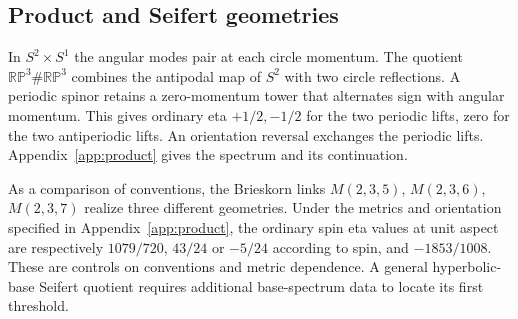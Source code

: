 \subsection{Product and Seifert geometries}
In \(S^2\times S^1\) the angular modes pair at each circle momentum. The quotient \(\mathbb{RP}^3\#\mathbb{RP}^3\) combines the antipodal map of \(S^2\) with two circle reflections. A periodic spinor retains a zero-momentum tower that alternates sign with angular momentum. This gives ordinary eta \(+1/2,-1/2\) for the two periodic lifts, zero for the two antiperiodic lifts. An orientation reversal exchanges the periodic lifts. Appendix~\ref{app:product} gives the spectrum and its continuation.

As a comparison of conventions, the Brieskorn links \(M(2,3,5)\), \(M(2,3,6)\), \(M(2,3,7)\) realize three different geometries. Under the metrics and orientation specified in Appendix~\ref{app:product}, the ordinary spin eta values at unit aspect are respectively \(1079/720\), \(43/24\) or \(-5/24\) according to spin, and \(-1853/1008\). These are controls on conventions and metric dependence. A general hyperbolic-base Seifert quotient requires additional base-spectrum data to locate its first threshold.
